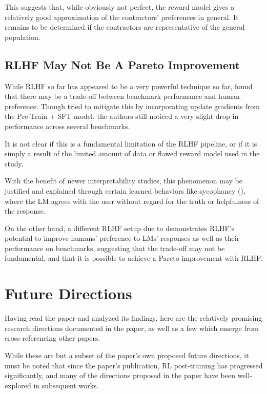 \documentclass{article} %
\begin{document}
This suggests that, while obviously not perfect, the reward model
gives a relatively good approximation of the contractors' preferences
in general. It remains to be determined if the contractors
are representative of the general population.

\subsection{RLHF May Not Be A Pareto Improvement} \label{sec:not-pareto}
While RLHF so far has appeared to be a very powerful technique
so far, \cite{InstructGPT-2022} found that there may be a trade-off between 
benchmark performance and human preference.
Though \cite{InstructGPT-2022} tried to mitigate this by incorporating
update gradients from the Pre-Train + SFT model, the authors still noticed
a very slight drop in performance across several benchmarks.

It is not clear if this is a fundamental limitation of the RLHF
pipeline, or if it is simply a result of the limited amount of data
or flawed reward model used in the study.

With the benefit of newer interpretability studies, this phenomenon
may be justified and explained through certain learned behaviors like
sycophancy (\cite{Sharma-et-al-2023}), where the LM agrees with the user
without regard for the truth or helpfulness of the response.

On the other hand, a different RLHF setup due to \cite{Zheng-et-al-2024}
demonstrates RLHF's potential to improve humans' preference to LMs' responses
as well as their performance on benchmarks, suggesting that
the trade-off may not be fundamental, and that it is possible to
achieve a Pareto improvement with RLHF.

\section{Future Directions}

Having read the paper and analyzed its findings, here are the
relatively promising research directions documented in the paper,
as well as a few which emerge from cross-referencing other papers.

While these are but a subset of the paper's own proposed
future directions, it must be noted that since the paper's publication,
RL post-training has progressed significantly, and many of the
directions proposed in the paper have been well-explored in subsequent works.
\end{document}
